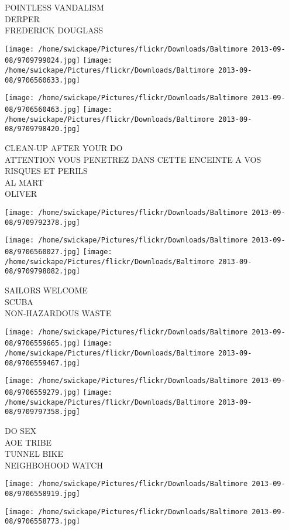 \documentclass[10pt,letterpaper]{article}
\begin{document}
POINTLESS VANDALISM\\
DERPER\\
FREDERICK DOUGLASS
\pagebreak

\texttt{[image: /home/swickape/Pictures/flickr/Downloads/Baltimore 2013-09-08/9709799024.jpg]}
\texttt{[image: /home/swickape/Pictures/flickr/Downloads/Baltimore 2013-09-08/9706560633.jpg]}

\texttt{[image: /home/swickape/Pictures/flickr/Downloads/Baltimore 2013-09-08/9706560463.jpg]}
\texttt{[image: /home/swickape/Pictures/flickr/Downloads/Baltimore 2013-09-08/9709798420.jpg]}

CLEAN{-}UP AFTER YOUR DO\\
ATTENTION VOUS PENETREZ DANS CETTE ENCEINTE A VOS RISQUES ET PERILS\\
AL MART\\
OLIVER
\pagebreak

\texttt{[image: /home/swickape/Pictures/flickr/Downloads/Baltimore 2013-09-08/9709792378.jpg]}

\vspace{0.25in}
\texttt{[image: /home/swickape/Pictures/flickr/Downloads/Baltimore 2013-09-08/9706560027.jpg]}
\texttt{[image: /home/swickape/Pictures/flickr/Downloads/Baltimore 2013-09-08/9709798082.jpg]}

SAILORS WELCOME\\
SCUBA\\
NON{-}HAZARDOUS WASTE
\pagebreak

\texttt{[image: /home/swickape/Pictures/flickr/Downloads/Baltimore 2013-09-08/9706559665.jpg]}
\texttt{[image: /home/swickape/Pictures/flickr/Downloads/Baltimore 2013-09-08/9706559467.jpg]}

\texttt{[image: /home/swickape/Pictures/flickr/Downloads/Baltimore 2013-09-08/9706559279.jpg]}
\texttt{[image: /home/swickape/Pictures/flickr/Downloads/Baltimore 2013-09-08/9709797358.jpg]}

DO SEX\\
AOE TRIBE\\
TUNNEL BIKE\\
NEIGHBOHOOD WATCH
\pagebreak

\texttt{[image: /home/swickape/Pictures/flickr/Downloads/Baltimore 2013-09-08/9706558919.jpg]}

\vspace{0.25in}
\texttt{[image: /home/swickape/Pictures/flickr/Downloads/Baltimore 2013-09-08/9706558773.jpg]}
\end{document}
